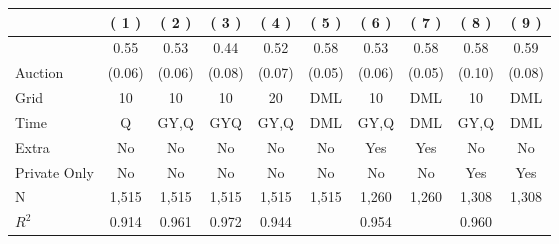 
\begin{tabular}{lccccccccc}
\toprule
 & ( 1 ) & ( 2 ) & ( 3 ) & ( 4 ) & ( 5 ) & ( 6 ) & ( 7 ) & ( 8 ) & ( 9 )\\
\midrule
 & 0.55 & 0.53 & 0.44 & 0.52 & 0.58 & 0.53 & 0.58 & 0.58 & 0.59\\

\multirow{-2}{*}{\raggedright\arraybackslash Auction} & (0.06) & (0.06) & (0.08) & (0.07) & (0.05) & (0.06) & (0.05) & (0.10) & (0.08)\\

\midrule
Grid & 10 & 10 & 10 & 20 & DML & 10 & DML & 10 & DML\\

Time & Q & GY,Q & GYQ & GY,Q & DML & GY,Q & DML & GY,Q & DML\\

Extra & No & No & No & No & No & Yes & Yes & No & No\\

Private Only & No & No & No & No & No & No & No & Yes & Yes\\

N & 1,515 & 1,515 & 1,515 & 1,515 & 1,515 & 1,260 & 1,260 & 1,308 & 1,308\\

$R^2$ & 0.914 & 0.961 & 0.972 & 0.944 &  & 0.954 &  & 0.960 & \\
\bottomrule
\end{tabular}
